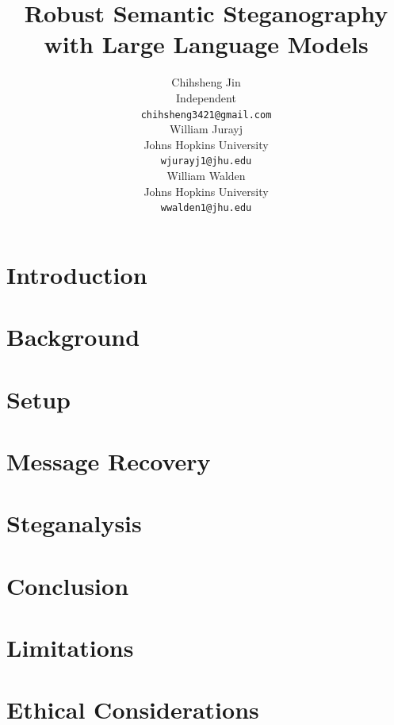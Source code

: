 \documentclass[11pt]{article}
\title{Robust Semantic Steganography with Large Language Models}
\author{Chihsheng Jin \\
  Independent \\
  \texttt{chihsheng3421@gmail.com} \\\And
  William Jurayj \\
  Johns Hopkins University \\
  \texttt{wjurayj1@jhu.edu} \\\And
  William Walden \\
  Johns Hopkins University \\
  \texttt{wwalden1@jhu.edu} 
  }
\begin{document}
\maketitle
\begin{abstract}

\end{abstract}

\section{Introduction}
\label{sec:intro}


\section{Background}
\label{sec:background}


\section{Setup}
\label{sec:experiments}


\section{Message Recovery}
\label{sec:main-results}


\section{Steganalysis}
\label{sec:steganalysis}


\section{Conclusion}
\label{sec:conclusion}


\section*{Limitations}
\label{sec:limitations}


\section*{Ethical Considerations}
\label{sec:ethics}



\clearpage
\end{document}
